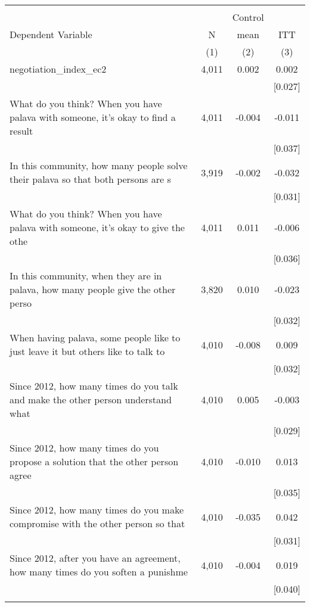 \begin{tabular}{lccc}
\hline \noalign{\smallskip} &  &  & \\
 &  & Control & \\
Dependent Variable & N & mean & ITT\\
 & (1) & (2) & (3)\\
\noalign{\smallskip}\hline \noalign{\smallskip}negotiation_index_ec2 & 4,011 & 0.002 & 0.002\\
 &  &  & [0.027]\\
What do you think? When you have palava with someone, it's okay to find a result & 4,011 & -0.004 & -0.011\\
 &  &  & [0.037]\\
In this community, how many people solve their palava so that both persons are s & 3,919 & -0.002 & -0.032\\
 &  &  & [0.031]\\
What do you think? When you have palava with someone, it's okay to give the othe & 4,011 & 0.011 & -0.006\\
 &  &  & [0.036]\\
In this community, when they are in palava, how many people give the other perso & 3,820 & 0.010 & -0.023\\
 &  &  & [0.032]\\
When having palava, some people like to just leave it but others like to talk to & 4,010 & -0.008 & 0.009\\
 &  &  & [0.032]\\
Since 2012, how many times do you talk and make the other person understand what & 4,010 & 0.005 & -0.003\\
 &  &  & [0.029]\\
Since 2012, how many times do you propose a solution that the other person agree & 4,010 & -0.010 & 0.013\\
 &  &  & [0.035]\\
Since 2012, how many times do you make compromise with the other person so that  & 4,010 & -0.035 & 0.042\\
 &  &  & [0.031]\\
Since 2012, after you have an agreement, how many times do you soften a punishme & 4,010 & -0.004 & 0.019\\
 &  &  & [0.040]\\
\noalign{\smallskip}\hline\end{tabular}

